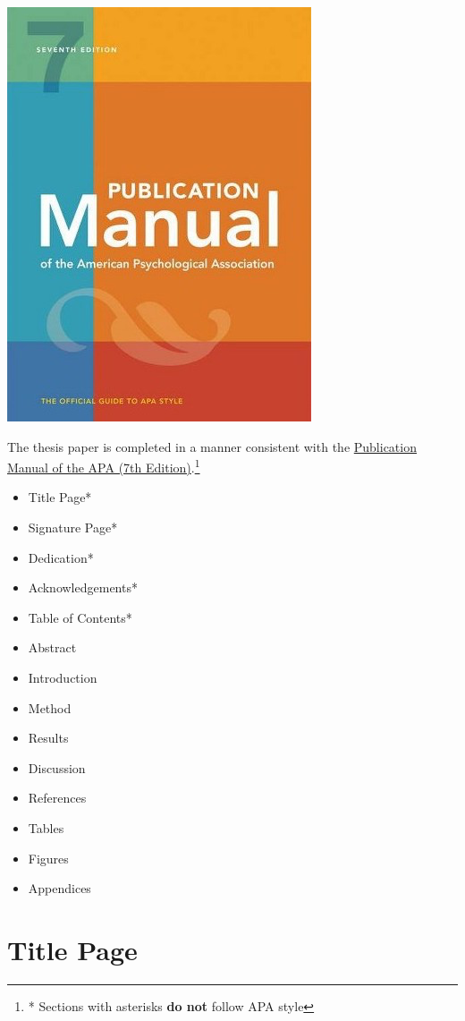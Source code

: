 \documentclass[openany]{book}
\providecommand{\tightlist}{%
  \setlength{\itemsep}{0pt}\setlength{\parskip}{0pt}}
\begin{document}
\includegraphics{images/apamanual.png}

The thesis paper is completed in a manner consistent with the \href{https://www.amazon.com/s?k=apa+publication+manual+7th+edition\&crid=7T10VJ2PYQZH\&sprefix=apa+pu\%2Caps\%2C261\&ref=nb_sb_ss_i_1_6}{Publication Manual of the APA (7th Edition)}.\footnote{* Sections with asterisks \textbf{do not} follow APA style}

\begin{itemize}
\tightlist
\item
  Title Page*
\item
  Signature Page*
\item
  Dedication*
\item
  Acknowledgements*
\item
  Table of Contents*
\item
  Abstract
\item
  Introduction
\item
  Method
\item
  Results
\item
  Discussion
\item
  References
\item
  Tables
\item
  Figures
\item
  Appendices
\end{itemize}

\hypertarget{title-page}{%
\section{Title Page}\label{title-page}}
\end{document}
